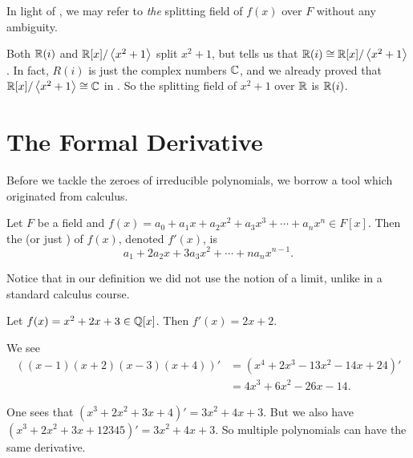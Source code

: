 In light of , we may refer to \textit{the} splitting field of $f(x)$ over $F$ without any ambiguity.

\begin{example}
    Both $\mathbb{R}(i)$ and $\mathbb{R}[x]/\left\langle x^2+1\right\rangle$ split $x^2+1$, but  tells us that $\mathbb{R}(i) \cong \mathbb{R}[x]/\left\langle x^2+1\right\rangle$. In fact, $R(i)$ is just the complex numbers $\mathbb{C}$, and we already proved that $\mathbb{R}[x]/\left\langle x^2+1\right\rangle \cong \mathbb{C}$ in . So the splitting field of $x^2+1$ over $\mathbb{R}$ is $\mathbb{R}(i)$.
\end{example}

\section{The Formal Derivative}
Before we tackle the zeroes of irreducible polynomials, we borrow a tool which originated from calculus.

\begin{definition}
    Let $F$ be a field and $f(x) = a_0 + a_1x + a_2x^2 + a_3x^3 + \cdots + a_nx^n \in F[x]$. Then the  (or just ) of $f(x)$, denoted $f'(x)$, is
    \[
        a_1 + 2a_2x + 3a_3x^2 + \cdots + na_nx^{n-1}.
    \]
\end{definition}

Notice that in our definition we did not use the notion of a limit, unlike in a standard calculus course.

\begin{example}
    Let $f(x) = x^2 + 2x + 3 \in \mathbb{Q}[x]$. Then $f'(x) = 2x + 2$.
\end{example}

\begin{example}
    We see
    \begin{align*}
        \left((x-1)(x+2)(x-3)(x+4)\right)'
        &= (x^4 + 2x^3 - 13x^2 - 14x + 24)'\\
        &= 4x^3 + 6x^2 - 26x - 14.
    \end{align*}
\end{example}

\begin{example}
    One sees that $(x^3 + 2x^2 + 3x + 4)' = 3x^2 + 4x + 3$. But we also have $(x^3 + 2x^2 + 3x + 12345)' = 3x^2 + 4x + 3$. So multiple polynomials can have the same derivative.
\end{example}

